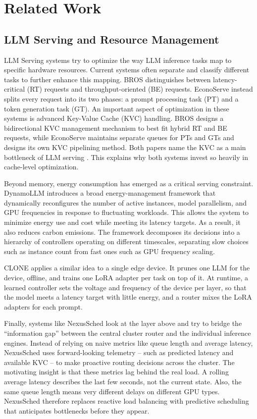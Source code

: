 \chapter{Related Work}
\label{chapter:relatedWork}

\section{LLM Serving and Resource Management}

LLM Serving systems try to optimize the way LLM inference tasks map to specific hardware resources.
Current systems often separate and classify different tasks to further enhance this mapping.
BROS \cite{bros} distinguishes between latency-critical (RT) requests and throughput-oriented (BE) requests.
EconoServe \cite{econoserve} instead splits every request into its two phases: a prompt processing task (PT) and a token generation task (GT).
An important aspect of optimization in these systems is advanced Key-Value Cache (KVC) handling.
BROS designs a bidirectional KVC management mechanism to best fit hybrid RT and BE requests, while EconoServe maintains separate queues for PTs and GTs and designs its own KVC pipelining method.
Both papers name the KVC as a main bottleneck of LLM serving \cite{bros, econoserve}.
This explains why both systems invest so heavily in cache-level optimization.

Beyond memory, energy consumption has emerged as a critical serving constraint.
DynamoLLM \cite{dynamollm} introduces a broad energy-management framework that dynamically reconfigures the number of active instances, model parallelism, and GPU frequencies in response to fluctuating workloads.
This allows the system to minimize energy use and cost while meeting its latency targets.
As a result, it also reduces carbon emissions.
The framework decomposes its decisions into a hierarchy of controllers operating on different timescales, separating slow choices such as instance count from fast ones such as GPU frequency scaling.

CLONE \cite{clone} applies a similar idea to a single edge device.
It prunes one LLM for the device, offline, and trains one LoRA adapter per task on top of it.
At runtime, a learned controller sets the voltage and frequency of the device per layer, so that the model meets a latency target with little energy, and a router mixes the LoRA adapters for each prompt.

Finally, systems like NexusSched \cite{nexussched} look at the layer above and try to bridge the ``information gap'' between the central cluster router and the individual inference engines.
Instead of relying on naive metrics like queue length and average latency, NexusSched uses forward-looking telemetry -- such as predicted latency and available KVC -- to make proactive routing decisions across the cluster.
The motivating insight is that these metrics lag behind the real load.
A rolling average latency describes the last few seconds, not the current state.
Also, the same queue length means very different delays on different GPU types.
NexusSched therefore replaces reactive load balancing with predictive scheduling that anticipates bottlenecks before they appear.

